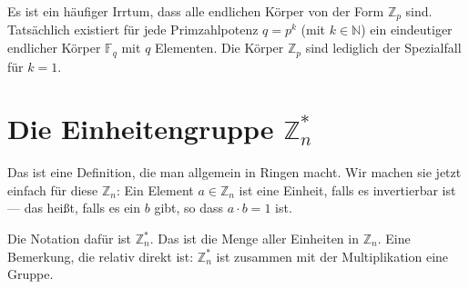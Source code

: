 \begin{didactic-insight}
Es ist ein häufiger Irrtum, dass alle endlichen Körper von der Form $\mathbb{Z}_p$ sind. Tatsächlich existiert für jede Primzahlpotenz $q = p^k$ (mit $k \in \mathbb{N}$) ein eindeutiger endlicher Körper $\mathbb{F}_q$ mit $q$ Elementen. Die Körper $\mathbb{Z}_p$ sind lediglich der Spezialfall für $k=1$.
\end{didactic-insight}

\begin{ai-global-state-checkpoint-invisible-content}
\end{ai-global-state-checkpoint-invisible-content}

\section{Die Einheitengruppe \texorpdfstring{$\mathbb{Z}_n^*$}{Zn*}}

\begin{spoken-clean}[00:34:43 - 00:36:26]
Das ist eine Definition, die man allgemein in Ringen macht. Wir machen sie jetzt einfach für diese $\mathbb{Z}_n$: Ein Element $a \in \mathbb{Z}_n$ ist eine Einheit, falls es invertierbar ist --- das heißt, falls es ein $b$ gibt, so dass $a \cdot b = 1$ ist.

Die Notation dafür ist $\mathbb{Z}_n^*$. Das ist die Menge aller Einheiten in $\mathbb{Z}_n$. Eine Bemerkung, die relativ direkt ist: $\mathbb{Z}_n^*$ ist zusammen mit der Multiplikation eine Gruppe.
\end{spoken-clean}

\begin{math-stroke}

\end{math-stroke}

